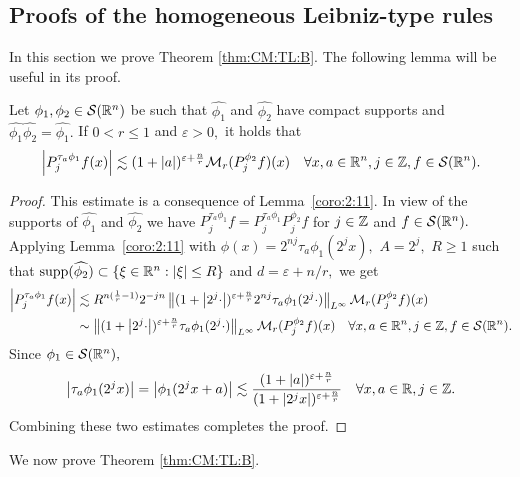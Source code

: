  
\subsection{Proofs of the homogeneous Leibniz-type rules}
 
In this section we prove Theorem \ref{thm:CM:TL:B}. The following lemma will be useful in its proof.

\begin{lemma}\label{lem:pointineq} Let $\phi_1,\phi_2\in {\mathcal{S}}({{\mathbb R}^n})$ be  such that $\widehat{\phi_1}$ and $\widehat{\phi_2}$ have compact supports and  $\widehat{\phi_1}\widehat{\phi_2}=\widehat{\phi_1}.$  If $0<r\le 1$ and $\varepsilon>0,$ it holds that
\begin{align*}
\left\vert P^{\tau_a\phi_1}_{j}f(x) \right\vert\lesssim (1+\left\vert a \right\vert)^{\varepsilon+\frac{n}{r}} \mathcal{M}_r(P^{\phi_2}_{j}f)(x)\quad \forall x,a\in{{\mathbb R}^n}, j\in\mathbb{Z}, f\in{\mathcal{S}}({{\mathbb R}^n}).
\end{align*}
\end{lemma}

\begin{proof} This estimate is a consequence of Lemma~\ref{coro:2:11}. In view of the supports of $\widehat{\phi_1}$ and $\widehat{\phi_2}$ we have $P^{\tau_a\phi_1}_{j}f=P^{\tau_a\phi_1}_{j}P^{\phi_2}_{j}f$ for  $j\in \mathbb{Z} $ and $f\in {\mathcal{S}}({{\mathbb R}^n}).$ Applying Lemma~\ref{coro:2:11} with $\phi(x)=2^{nj}\tau_a \phi_1(2^j x),$ $A=2^j,$ $R\ge 1$ such that ${\rm{supp}}(\widehat{\phi_2})\subset \{\xi\in{{\mathbb R}^n}:\left\vert \xi \right\vert\le R\}$ and $d=\varepsilon+n/r,$ we get
\begin{align*}
\left\vert P^{\tau_a\phi_1}_{j}f(x) \right\vert&\lesssim R^{n(\frac{1}{r}-1)} 2^{-jn}\left\|(1+\left\vert 2^j\cdot \right\vert)^{\varepsilon+\frac{n}{r}}2^{nj}\tau_a \phi_1(2^j\cdot)\right\|_{L^\infty}\mathcal{M}_r(P^{\phi_2}_{j}f)(x)\\
&\sim \left\|(1+\left\vert 2^j\cdot \right\vert)^{\varepsilon+\frac{n}{r}}\tau_a \phi_1(2^j\cdot)\right\|_{L^\infty}\mathcal{M}_r(P^{\phi_2}_{j}f)(x)\quad \forall x,a\in {{\mathbb R}^n}, j\in \mathbb{Z}, f\in{\mathcal{S}}({{\mathbb R}^n}).
\end{align*}
Since $\phi_1\in {\mathcal{S}}({{\mathbb R}^n}),$ 
\[
\left\vert \tau_a \phi_1(2^jx) \right\vert=\left\vert \phi_1(2^j x +a) \right\vert\lesssim \frac{(1+\left\vert a \right\vert)^{\varepsilon+\frac{n}{r}}}{(1+\left\vert 2^jx \right\vert)^{\varepsilon+\frac{n}{r}}}\quad \forall x,a\in \mathbb{R},j\in \mathbb{Z}.
\]
Combining these two estimates completes the proof.
\end{proof}

We now prove Theorem \ref{thm:CM:TL:B}.
 
